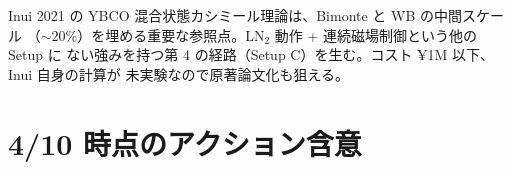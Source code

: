 \documentclass[11pt,a4paper]{article}
\def\textbf#1{#1}%
\begin{document}
\begin{tcolorbox}[colback=green!5,colframe=green!50!black,title=§8 の一行まとめ]
Inui 2021 の YBCO 混合状態カシミール理論は、\textbf{Bimonte と WB の中間スケール
（$\sim 20\%$）を埋める}重要な参照点。LN$_2$ 動作 + 連続磁場制御という他の Setup に
ない強みを持つ第 4 の経路（Setup C）を生む。コスト ¥1M 以下、Inui 自身の計算が
未実験なので原著論文化も狙える。
\end{tcolorbox}

\section{4/10 時点のアクション含意}
\end{document}
